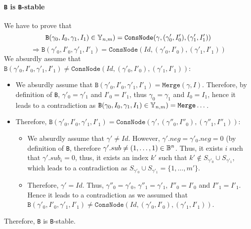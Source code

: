 \documentclass[a4paper,10pt]{article}
\begin{document}
\paragraph{\texttt{B} is \texttt{B}-stable}
We have to prove that
\[\mathtt{B}(\gamma_0, I_0, \gamma_1, I_1) \in \mathbb{Y}_{n, m}) = \mathtt{ConsNode}(\gamma, (\gamma'_0, I'_0), (\gamma'_1, I'_1))\] \[\Rightarrow \mathtt{B}(\gamma'_0, I'_0, \gamma'_1, I'_1) = \mathtt{ConsNode}(Id, (\gamma'_0, I'_0), (\gamma'_1, I'_1))\]
We absurdly assume that $\mathtt{B}(\gamma'_0, I'_0, \gamma'_1, I'_1) \neq \mathtt{ConsNode}(Id, (\gamma'_0, I'_0), (\gamma'_1, I'_1))$:\begin{itemize}
\item We absurdly assume that $\mathtt{B}(\gamma'_0, I'_0, \gamma'_1, I'_1) = \mathtt{Merge}(\gamma, I)$.
Therefore, by definition of \texttt{B}, $\gamma'_0 = \gamma'_1$ and $I'_0 = I'_1$, thus $\gamma_0 = \gamma_1$ and $I_0 = I_1$, hence it leads to a contradiction as $\mathtt{B}(\gamma_0, I_0, \gamma_1, I_1) \in \mathbb{Y}_{n, m}) = \mathtt{Merge} \dots$.
\item Therefore, $\mathtt{B}(\gamma'_0, I'_0, \gamma'_1, I'_1) = \mathtt{ConsNode}(\gamma', (\gamma''_0, I''_0), (\gamma''_1, I''_1))$:\begin{itemize}
\item We absurdly assume that $\gamma' \neq Id$.
However, $\gamma'.neg = \gamma'_0.neg = 0$ (by definition of \texttt{B}, therefore $\gamma'.sub \neq (1, \dots, 1) \in\mathbb{B}^n$.
Thus, it exists $i$ such that $\gamma'.sub_i = 0$, thus, it exists an index $k'$ such that $k'\not\in S_{\gamma'_0}\cup S_{\gamma'_1}$, which leads to a contradiction as $S_{\gamma'_0}\cup S_{\gamma'_1} = \{1, \dots, m'\}$.
\item Therefore, $\gamma' = Id$.
Thus, $\gamma''_0 = \gamma'_0$, $\gamma''_1 = \gamma'_1$, $I''_0 = I'_0$ and $I''_1 = I'_1$.
Hence it leads to a contradiction as we assumed that $\mathtt{B}(\gamma'_0, I'_0, \gamma'_1, I'_1) \neq \mathtt{ConsNode}(Id, (\gamma'_0, I'_0), (\gamma'_1, I'_1))$.
\end{itemize}
\end{itemize}

Therefore, \texttt{B} is \texttt{B}-stable.
\end{document}
